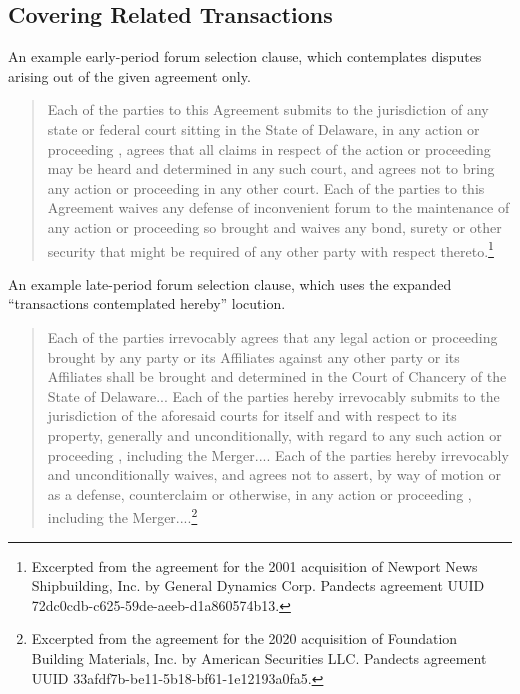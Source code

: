 \documentclass[12pt]{article}
\begin{document}
{\begin{appendices}
\subsection{Covering Related Transactions}
\label{app:excerpt-related-tx}
An example early-period forum selection clause, which contemplates disputes arising out of the given agreement only.
\begingroup
\singlespacing
\begin{quote}
  Each of the parties to this Agreement submits to the jurisdiction of any state or federal court sitting in the State of Delaware, in any action or proceeding , agrees that all claims in respect of the action or proceeding may be heard and determined in any such court, and agrees not to bring any action or proceeding  in any other court. Each of the parties to this Agreement waives any defense of inconvenient forum to the maintenance of any action or proceeding so brought and waives any bond, surety or other security that might be required of any other party with respect thereto.\footnote{Excerpted from the agreement for the 2001 acquisition of Newport News Shipbuilding, Inc. by General Dynamics Corp. Pandects agreement UUID 72dc0cdb-c625-59de-aeeb-d1a860574b13.}
\end{quote}
\endgroup

An example late-period forum selection clause, which uses the expanded ``transactions contemplated hereby'' locution.
\begingroup
\singlespacing
\begin{quote}
  Each of the parties irrevocably agrees that any legal action or proceeding  brought by any party or its Affiliates against any other party or its Affiliates shall be brought and determined in the Court of Chancery of the State of Delaware... Each of the parties hereby irrevocably submits to the jurisdiction of the aforesaid courts for itself and with respect to its property, generally and unconditionally, with regard to any such action or proceeding , including the Merger.... Each of the parties hereby irrevocably and unconditionally waives, and agrees not to assert, by way of motion or as a defense, counterclaim or otherwise, in any action or proceeding , including the Merger....\footnote{Excerpted from the agreement for the 2020 acquisition of Foundation Building Materials, Inc. by American Securities LLC. Pandects agreement UUID 33afdf7b-be11-5b18-bf61-1e12193a0fa5.}
\end{quote}
\endgroup


\end{appendices}}
\end{document}
